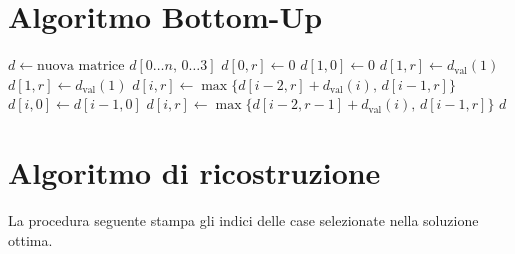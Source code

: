 \section{Algoritmo Bottom-Up}
\begin{algorithm}[htbp]
\caption{Calcolo Bottom-Up per Hateville con al massimo 3 case rosse}
\begin{algorithmic}[1]
    \State $d \gets \text{nuova matrice } d[0 \dots n, \, 0 \dots 3]$
        \State $d[0, r] \gets 0$
    \EndFor
                \State $d[1, 0] \gets 0$
            \Else
                \State $d[1, r] \gets d_{\text{val}}(1)$
            \EndIf
        \Else
            \State $d[1, r] \gets d_{\text{val}}(1)$
        \EndIf
    \EndFor
                \State $d[i, r] \gets \max \{ d[i-2, r] + d_{\text{val}}(i), \, d[i-1, r] \}$
            \Else
                    \State $d[i, 0] \gets d[i-1, 0]$
                \Else
                    \State $d[i, r] \gets \max \{ d[i-2, r-1] + d_{\text{val}}(i), \, d[i-1, r] \}$
                \EndIf
            \EndIf
        \EndFor
    \EndFor
    \State \Return $d$
\EndProcedure
\end{algorithmic}
\end{algorithm}

\section{Algoritmo di ricostruzione}
La procedura seguente stampa gli indici delle case selezionate nella soluzione ottima.


